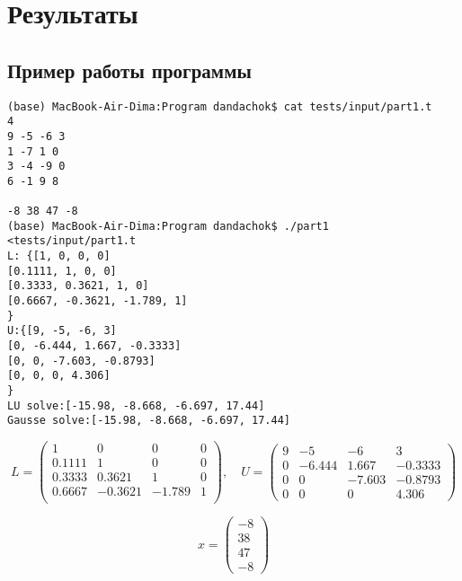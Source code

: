 \section*{Результаты}

\subsection*{Пример работы программы}

\begin{lstlisting}
(base) MacBook-Air-Dima:Program dandachok$ cat tests/input/part1.t
4
9 -5 -6 3
1 -7 1 0
3 -4 -9 0
6 -1 9 8

-8 38 47 -8
(base) MacBook-Air-Dima:Program dandachok$ ./part1 <tests/input/part1.t
L: {[1, 0, 0, 0]
[0.1111, 1, 0, 0]
[0.3333, 0.3621, 1, 0]
[0.6667, -0.3621, -1.789, 1]
}
U:{[9, -5, -6, 3]
[0, -6.444, 1.667, -0.3333]
[0, 0, -7.603, -0.8793]
[0, 0, 0, 4.306]
}
LU solve:[-15.98, -8.668, -6.697, 17.44]
Gausse solve:[-15.98, -8.668, -6.697, 17.44]
\end{lstlisting}

$$L = \begin{pmatrix}
    1 & 0 & 0 & 0 \\
    0.1111 & 1 & 0 & 0 \\
    0.3333 & 0.3621 & 1 & 0 \\
    0.6667 & -0.3621 & -1.789 & 1 \\
\end{pmatrix},\quad
U = \begin{pmatrix}
    9 & -5 & -6 & 3 \\
    0 & -6.444 & 1.667 & -0.3333 \\
    0 & 0 & -7.603 & -0.8793 \\
    0 & 0 & 0 & 4.306
\end{pmatrix}$$

$$x=\begin{pmatrix}
    -8 \\
    38 \\
    47 \\
    -8
\end{pmatrix}$$

\pagebreak